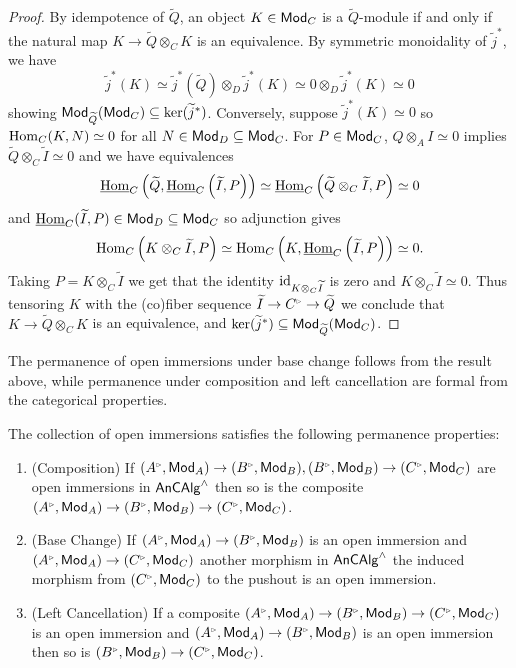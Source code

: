 \begin{proof}
    By idempotence of $\widetilde{Q}$, an object $K\in\mathsf{Mod}_{C}$ is a $\widetilde{Q}$-module if and only if the natural map $K\to\widetilde{Q}\otimes_{C}K$ is an equivalence. By symmetric monoidality of $\widetilde{j}^{*}$, we have 
    $$\widetilde{j}^{*}(K)\simeq\widetilde{j}^{*}(\widetilde{Q})\otimes_{D}\widetilde{j}^{*}(K)\simeq 0\otimes_{D}\widetilde{j}^{*}(K)\simeq0$$
    showing $\mathsf{Mod}_{\widetilde{Q}}(\mathsf{Mod}_{C})\subseteq\ker(\widetilde{j}^{*})$. Conversely, suppose $\widetilde{j}^{*}(K)\simeq0$ so $\mathrm{Hom}_{C}(K,N)\simeq0$ for all $N\in\mathsf{Mod}_{D}\subseteq\mathsf{Mod}_{C}$. For $P\in\mathsf{Mod}_{C}$, $Q\otimes_{A}I\simeq0$ implies $\widetilde{Q}\otimes_{C}\widetilde{I}\simeq0$ and we have equivalences
    $$\underline{\mathrm{Hom}}_{C}\left(\widetilde{Q},\underline{\mathrm{Hom}}_{C}\left(\widetilde{I},P\right)\right)\simeq\underline{\mathrm{Hom}}_{C}\left(\widetilde{Q}\otimes_{C}\widetilde{I},P\right)\simeq0$$
    and $\underline{\mathrm{Hom}}_{C}(\widetilde{I},P)\in\mathsf{Mod}_{D}\subseteq\mathsf{Mod}_{C}$ so adjunction gives 
    $$\mathrm{Hom}_{C}\left(K\otimes_{C}\widetilde{I},P\right)\simeq\mathrm{Hom}_{C}\left(K,\underline{\mathrm{Hom}}_{C}\left(\widetilde{I},P\right)\right)\simeq0.$$
    Taking $P=K\otimes_{C}\widetilde{I}$ we get that the identity $\mathrm{id}_{K\otimes_{C}\widetilde{I}}$ is zero and $K\otimes_{C}\widetilde{I}\simeq0$. Thus tensoring $K$ with the (co)fiber sequence $\widetilde{I}\to C^{\tri}\to\widetilde{Q}$ we conclude that $K\to\widetilde{Q}\otimes_{C}K$ is an equivalence, and $\ker(\widetilde{j}^{*})\subseteq\mathsf{Mod}_{\widetilde{Q}}(\mathsf{Mod}_{C})$. 
\end{proof}
The permanence of open immersions under base change follows from the result above, while permanence under composition and left cancellation are formal from the categorical properties. 
\begin{proposition}\label{prop: permanence of open immersions}
    The collection of open immersions satisfies the following permanence properties: 
    \begin{enumerate}
        \item (Composition) If $(A^{\tri},\Mod_{A})\to (B^{\tri},\Mod_{B}), (B^{\tri},\Mod_{B})\to (C^{\tri},\Mod_{C})$ are open immersions in $\mathsf{An}\mathsf{CAlg}^{\wedge}$ then so is the composite $(A^{\tri},\Mod_{A})\to (B^{\tri},\Mod_{B})\to (C^{\tri},\Mod_{C})$. 
        \item (Base Change) If $(A^{\tri},\Mod_{A})\to (B^{\tri},\Mod_{B})$ is an open immersion and $(A^{\tri},\Mod_{A})\to (C^{\tri},\Mod_{C})$ another morphism in $\mathsf{An}\mathsf{CAlg}^{\wedge}$ the induced morphism from $(C^{\tri},\Mod_{C})$ to the pushout is an open immersion. 
        \item (Left Cancellation) If a composite $(A^{\tri},\Mod_{A})\to (B^{\tri},\Mod_{B})\to (C^{\tri},\Mod_{C})$ is an open immersion and $(A^{\tri},\Mod_{A})\to (B^{\tri},\Mod_{B})$ is an open immersion then so is $(B^{\tri},\Mod_{B})\to (C^{\tri},\Mod_{C})$. 
    \end{enumerate}
\end{proposition}

